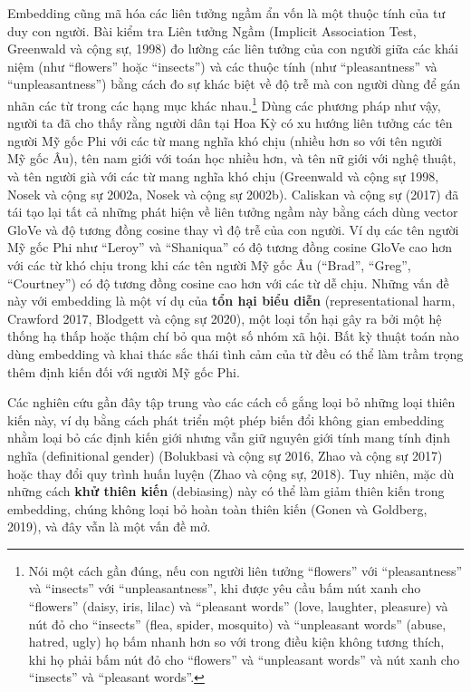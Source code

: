 Embedding cũng mã hóa các liên tưởng ngầm ẩn vốn là một thuộc tính của tư duy con người. Bài kiểm tra Liên tưởng Ngầm (Implicit Association Test, Greenwald và cộng sự, 1998) đo lường các liên tưởng của con người giữa các khái niệm (như ``flowers'' hoặc ``insects'') và các thuộc tính (như ``pleasantness'' và ``unpleasantness'') bằng cách đo sự khác biệt về độ trễ mà con người dùng để gán nhãn các từ trong các hạng mục khác nhau.\footnote{Nói một cách gần đúng, nếu con người liên tưởng ``flowers'' với ``pleasantness'' và ``insects'' với ``unpleasantness'', khi được yêu cầu bấm nút xanh cho ``flowers'' (daisy, iris, lilac) và ``pleasant words'' (love, laughter, pleasure) và nút đỏ cho ``insects'' (flea, spider, mosquito) và ``unpleasant words'' (abuse, hatred, ugly) họ bấm nhanh hơn so với trong điều kiện không tương thích, khi họ phải bấm nút đỏ cho ``flowers'' và ``unpleasant words'' và nút xanh cho ``insects'' và ``pleasant words''.} Dùng các phương pháp như vậy, người ta đã cho thấy rằng người dân tại Hoa Kỳ có xu hướng liên tưởng các tên người Mỹ gốc Phi với các từ mang nghĩa khó chịu (nhiều hơn so với tên người Mỹ gốc Âu), tên nam giới với toán học nhiều hơn, và tên nữ giới với nghệ thuật, và tên người già với các từ mang nghĩa khó chịu (Greenwald và cộng sự 1998, Nosek và cộng sự 2002a, Nosek và cộng sự 2002b). Caliskan và cộng sự (2017) đã tái tạo lại tất cả những phát hiện về liên tưởng ngầm này bằng cách dùng vector GloVe và độ tương đồng cosine thay vì độ trễ của con người. Ví dụ các tên người Mỹ gốc Phi như ``Leroy'' và ``Shaniqua'' có độ tương đồng cosine GloVe cao hơn với các từ khó chịu trong khi các tên người Mỹ gốc Âu (``Brad'', ``Greg'', ``Courtney'') có độ tương đồng cosine cao hơn với các từ dễ chịu. Những vấn đề này với embedding là một ví dụ của \textbf{tổn hại biểu diễn} (representational harm, Crawford 2017, Blodgett và cộng sự 2020), một loại tổn hại gây ra bởi một hệ thống hạ thấp hoặc thậm chí bỏ qua một số nhóm xã hội. Bất kỳ thuật toán nào dùng embedding và khai thác sắc thái tình cảm của từ đều có thể làm trầm trọng thêm định kiến đối với người Mỹ gốc Phi.

Các nghiên cứu gần đây tập trung vào các cách cố gắng loại bỏ những loại thiên kiến này, ví dụ bằng cách phát triển một phép biến đổi không gian embedding nhằm loại bỏ các định kiến giới nhưng vẫn giữ nguyên giới tính mang tính định nghĩa (definitional gender) (Bolukbasi và cộng sự 2016, Zhao và cộng sự 2017) hoặc thay đổi quy trình huấn luyện (Zhao và cộng sự, 2018). Tuy nhiên, mặc dù những cách \textbf{khử thiên kiến} (debiasing) này có thể làm giảm thiên kiến trong embedding, chúng không loại bỏ hoàn toàn thiên kiến (Gonen và Goldberg, 2019), và đây vẫn là một vấn đề mở.

